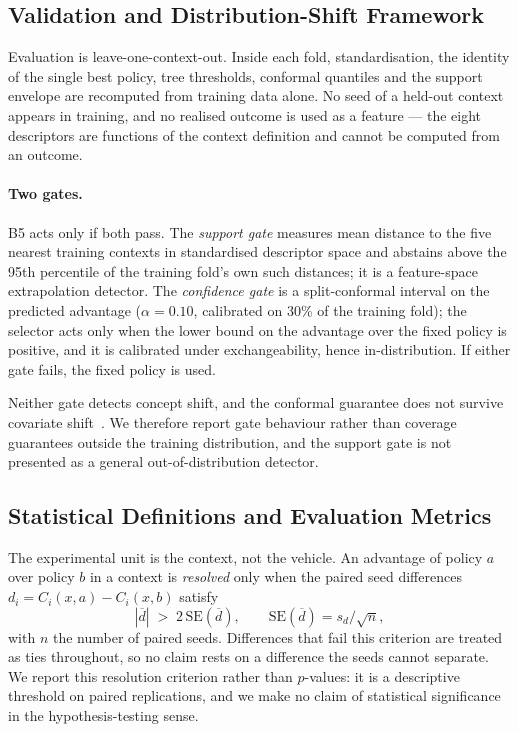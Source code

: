 \subsection{Validation and Distribution-Shift Framework}

Evaluation is leave-one-context-out. Inside each fold, standardisation, the
identity of the single best policy, tree thresholds, conformal quantiles and
the support envelope are recomputed from training data alone. No seed of a
held-out context appears in training, and no realised outcome is used as a
feature --- the eight descriptors are functions of the context definition and
cannot be computed from an outcome.

\paragraph{Two gates.} B5 acts only if both pass. The \emph{support gate}
measures mean distance to the five nearest training contexts in standardised
descriptor space and abstains above the 95th percentile of the training fold's
own such distances; it is a feature-space extrapolation detector. The
\emph{confidence gate} is a split-conformal interval on the predicted advantage
($\alpha=0.10$, calibrated on 30\% of the training fold); the selector acts only
when the lower bound on the advantage over the fixed policy is positive, and it
is calibrated under exchangeability, hence in-distribution. If either gate
fails, the fixed policy is used.

Neither gate detects concept shift, and the conformal guarantee does not survive
covariate shift~\cite{shimodaira2000,tibshirani2019covshift}. We therefore
report gate behaviour rather than coverage guarantees outside the training
distribution, and the support gate is not presented as a general
out-of-distribution detector.

\subsection{Statistical Definitions and Evaluation Metrics}
\label{sec:stats}

The experimental unit is the context, not the vehicle. An advantage of policy
$a$ over policy $b$ in a context is \emph{resolved} only when the paired seed
differences $d_i = C_i(x,a) - C_i(x,b)$ satisfy
\begin{equation}
|\overline{d}| \;>\; 2\,\mathrm{SE}(\overline{d}),
\qquad
\mathrm{SE}(\overline{d}) = s_d / \sqrt{n},
\label{eq:resolved}
\end{equation}
with $n$ the number of paired seeds. Differences that fail this criterion are
treated as ties throughout, so no claim rests on a difference the seeds cannot
separate. We report this resolution criterion rather than $p$-values: it is a
descriptive threshold on paired replications, and we make no claim of
statistical significance in the hypothesis-testing sense.

